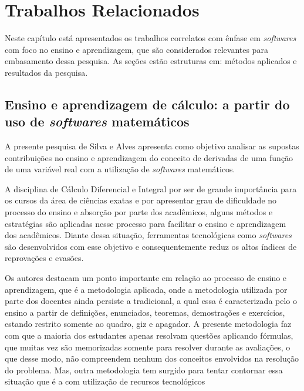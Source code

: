 \chapter{Trabalhos Relacionados}
\label{cap:trabalhos}

\noindent Neste capítulo está apresentados os trabalhos correlatos com ênfase em \textit{softwares} com foco no ensino e aprendizagem, que são considerados relevantes para embasamento dessa pesquisa. As seções estão estruturas em: métodos aplicados e resultados da pesquisa.

\section{Ensino e aprendizagem de cálculo: a partir do uso de \textit{softwares} matemáticos}

\noindent A presente pesquisa de Silva e Alves \cite{2016:Santana} apresenta como objetivo analisar as supostas contribuições no ensino e aprendizagem do conceito de derivadas de uma função de uma variável real com a utilização de \textit{softwares} matemáticos.

A disciplina de Cálculo Diferencial e Integral por ser de grande importância para os cursos da área de ciências exatas e por apresentar grau de dificuldade no processo do ensino e absorção por parte dos acadêmicos, alguns métodos e estratégias são aplicadas nesse processo para facilitar o ensino e aprendizagem dos acadêmicos. Diante dessa situação, ferramentas tecnológicas como \textit{softwares} são desenvolvidos com esse objetivo e consequentemente reduz os altos índices de reprovações e evasões. 

Os autores destacam um ponto importante em relação ao processo de ensino e aprendizagem, que é a metodologia aplicada, onde a metodologia utilizada por parte dos docentes ainda persiste a tradicional, a qual essa é caracterizada pelo o ensino a partir de definições, enunciados, teoremas, demostrações e exercícios, estando restrito somente ao quadro, giz e apagador. A presente metodologia faz com que a maioria dos estudantes apenas resolvam questões aplicando fórmulas, que muitas vez são memorizadas somente para resolver durante as avaliações, o que desse modo, não compreendem nenhum dos conceitos envolvidos na resolução do problema. Mas, outra metodologia tem surgido para tentar contornar essa situação que é a com utilização de recursos tecnológicos


